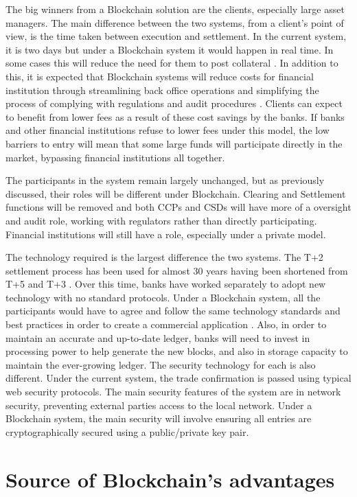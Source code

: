 \documentclass[pdftex]{article}
\begin{document}
The big winners from a Blockchain solution are the clients, especially large asset managers. The main difference between the two systems, from a client's point of view, is the time taken between execution and settlement. In the current system, it is two days but under a Blockchain system it would happen in real time. In some cases this will reduce the need for them to post collateral \cite{gentleIntro}. In addition to this, it is expected that Blockchain systems will reduce costs for financial institution through streamlining back office operations and simplifying the process of complying with regulations and audit procedures \cite{DBS}. Clients can expect to benefit from lower fees as a result of these cost savings by the banks. If banks and other financial institutions refuse to lower fees under this model, the low barriers to entry will mean that some large funds will participate directly in the market, bypassing financial institutions all together.

The participants in the system remain largely unchanged, but as previously discussed, their roles will be different under Blockchain. Clearing and Settlement functions will be removed and both CCPs and CSDs will have more of a oversight and audit role, working with regulators rather than directly participating. Financial institutions will still have a role, especially under a private model.

The technology required is the largest difference the two systems. The T+2 settlement process has been used for almost 30 years having been shortened from T+5 and T+3 \cite{CCP}. Over this time, banks have worked separately to adopt new technology with no standard protocols. Under a Blockchain system, all the participants would have to agree and follow the same technology standards and best practices in order to create a commercial application \cite{Deloitte}. Also, in order to maintain an accurate and up-to-date ledger, banks will need to invest in processing power to help generate the new blocks, and also in storage capacity to maintain the ever-growing ledger. The security technology for each is also different. Under the current system, the trade confirmation is passed using typical web security protocols. The main security features of the system are in network security, preventing external parties access to the local network. Under a Blockchain system, the main security will involve ensuring all entries are cryptographically secured using a public/private key pair.

\section{Source of Blockchain's advantages}
\end{document}
